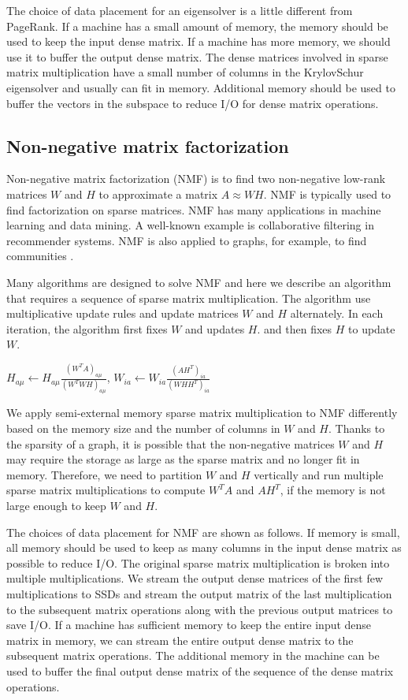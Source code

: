 The choice of data placement for an eigensolver is a little different from
PageRank. If a machine has a small amount of memory, the memory should be
used to keep the input dense matrix. If a machine has more memory, we should
use it to buffer the output dense matrix. The dense matrices involved in
sparse matrix multiplication have a small number of columns in
the KrylovSchur eigensolver and usually can fit in memory. 
Additional memory should be used to buffer the vectors in the subspace
to reduce I/O for dense matrix operations.

\subsection{Non-negative matrix factorization}
Non-negative matrix factorization (NMF) \cite{nmf} is to find two non-negative
low-rank matrices $W$ and $H$ to approximate a matrix $A \approx WH$. NMF is
typically used to find factorization on sparse matrices. NMF has many applications
in machine learning
and data mining. A well-known example is collaborative filtering \cite{cf} in
recommender systems. NMF is also applied to graphs, for example, to find communities
\cite{yang13, wang11}.

Many algorithms are designed to solve NMF and here we describe an algorithm
\cite{nmf} that requires a sequence of sparse matrix multiplication.
The algorithm use multiplicative update rules and update matrices $W$ and $H$
alternately. In each iteration, the algorithm first fixes $W$ and updates $H$.
and then fixes $H$ to update $W$.

$H_{a\mu} \leftarrow H_{a\mu} \frac{{(W^TA)}_{a\mu}}{{(W^TWH)}_{a\mu}}$,
$W_{ia} \leftarrow W_{ia} \frac{{(AH^T)}_{ia}}{{(WHH^T)}_{ia}}$

We apply semi-external memory sparse matrix multiplication to NMF differently
based on the memory size and the number of columns in $W$ and $H$. Thanks to
the sparsity of a graph, it is possible that the non-negative matrices $W$ and
$H$ may require the storage as large as the sparse matrix and no longer fit in
memory. Therefore, we need to partition $W$ and $H$ vertically and run multiple
sparse matrix multiplications to compute $W^TA$ and $AH^T$, if the memory is not
large enough to keep $W$ and $H$.

The choices of data placement for NMF are
shown as follows. If memory is small, all memory should be used to keep as many
columns in the input dense matrix as possible to reduce I/O. The original sparse
matrix multiplication is broken into multiple multiplications. We stream the output
dense matrices of the first few multiplications to SSDs and stream the output matrix
of the last multiplication to the subsequent matrix operations along with
the previous output matrices to save I/O.
If a machine has sufficient memory to keep the entire input dense matrix in memory,
we can stream the entire output dense matrix to the subsequent matrix operations.
The additional memory in the machine can be used to buffer the final output
dense matrix of the sequence of the dense matrix operations.
